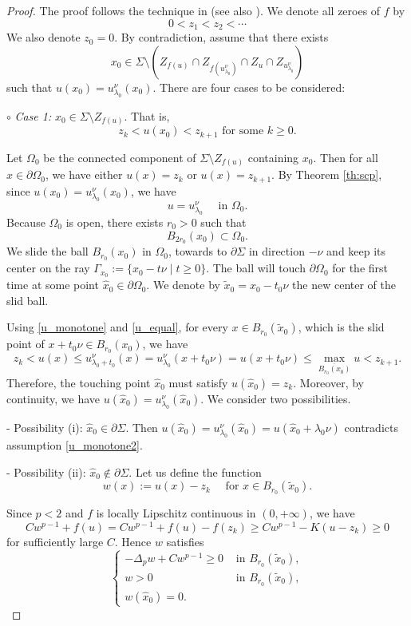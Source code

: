 \documentclass[reqno]{amsart}
\theoremstyle{plain}
\theoremstyle{definition}
\theoremstyle{remark}
\begin{document}
	\begin{proof}
		The proof follows the technique in \cite[Lemma 13]{MR4771444} (see also \cite{MR4635360,MR4377321}).
		We denote all zeroes of $f$ by
		\[
		0<z_1<z_2<\cdots
		\]
		We also denote $z_0=0$.		
		By contradiction, assume that there exists
		\[
		x_0 \in \Sigma \setminus \left(Z_{f(u)} \cap Z_{f(u_{\lambda_0}^\nu)} \cap Z_u \cap Z_{u_{\lambda_0}^\nu}\right)
		\]
		such that $u(x_0) = u_{\lambda_0}^\nu(x_0)$. There are four cases to be considered:
		
		$\circ$ \textit{Case 1:} $x_0 \in \Sigma \setminus Z_{f(u)}$. That is,
		\[
		z_k < u(x_0) < z_{k+1} \text{ for some } k\ge0.
		\]
		
		Let $\Omega_0$ be the connected component of $\Sigma\setminus Z_{f(u)}$ containing $x_0$. Then for all $x\in\partial\Omega_0$, we have either $u(x)=z_k$ or $u(x)=z_{k+1}$. By Theorem \ref{th:scp}, since $u(x_0) = u_{\lambda_0}^\nu(x_0)$, we have
		\begin{equation}\label{u_equal}
			u = u_{\lambda_0}^\nu \quad\text{ in } \Omega_0.
		\end{equation}
		Because $\Omega_0$ is open, there exists $r_0>0$ such that
		\[
		B_{2r_0}(x_0) \subset \Omega_0.
		\]
		We slide the ball $B_{r_0}(x_0)$ in $\Omega_0$, towards to $\partial\Sigma$ in direction $-\nu$ and keep its center on the ray $\Gamma_{x_0}:=\{x_0-t\nu \mid t\ge0\}$. The ball will touch $\partial\Omega_0$ for the first time at some point $\hat x_0\in\partial\Omega_0$. We denote by $\tilde x_0=x_0-t_0\nu$ the new center of the slid ball.
		
		Using \eqref{u_monotone} and \eqref{u_equal}, for every $x\in B_{r_0}(\tilde x_0)$, which is the slid point of $x+t_0\nu\in B_{r_0}(x_0)$, we have
		\[
		z_k < u(x) \le u_{\lambda_0+t_0}^\nu(x) =  u_{\lambda_0}^\nu(x+t_0\nu) = u(x+t_0\nu) \le \max_{\overline{B_{r_0}(x_0)}}u < z_{k+1}.
		\]
		Therefore, the touching point $\hat x_0$ must satisfy $u(\hat x_0)=z_k$. Moreover, by continuity, we have $u(\hat x_0) = u_{\lambda_0}^\nu(\hat x_0)$. We consider two possibilities.
		
		- Possibility (i): $\hat x_0\in\partial\Sigma$. Then $u(\hat x_0) = u_{\lambda_0}^\nu(\hat x_0) = u(\hat x_0 + \lambda_0\nu)$ contradicts assumption \eqref{u_monotone2}.
		
		- Possibility (ii): $\hat x_0\notin\partial\Sigma$. Let us define the function
		\[
		w(x) := u(x) - z_k \quad\text{ for }x\in B_{r_0}(\tilde x_0).
		\]
		
		Since $p<2$ and $f$ is locally Lipschitz continuous in $(0,+\infty)$, we have
		\[
		C w^{p-1} + f(u) = C w^{p-1} + f(u) - f(z_k) \ge C w^{p-1} - K(u-z_k) \ge 0
		\]
		for sufficiently large $C$.
		Hence $w$ satisfies
		\[
		\begin{cases}
			-\Delta_p w + C w^{p-1} \ge 0 &\text{ in } B_{r_0}(\tilde x_0),\\
			w>0 &\text{ in } B_{r_0}(\tilde x_0),\\
			w(\hat x_0)=0.
		\end{cases}
		\]
		

\end{proof}
\end{document}
